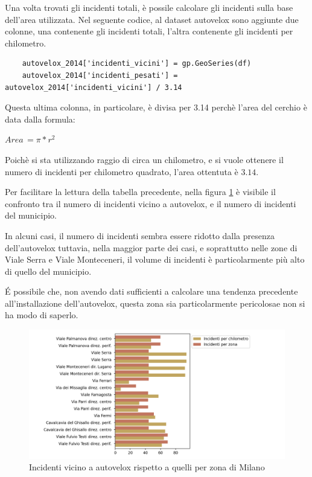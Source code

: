 \documentclass[a4paper]{report}
\begin{document}
Una volta trovati gli incidenti totali, è possile calcolare gli incidenti sulla base dell'area 
utilizzata.
Nel seguente codice, al dataset autovelox sono aggiunte due colonne, una contenente gli 
incidenti totali, l'altra contenente gli incidenti per chilometro.

\begin{lstlisting}
    autovelox_2014['incidenti_vicini'] = gp.GeoSeries(df)
    autovelox_2014['incidenti_pesati'] = autovelox_2014['incidenti_vicini'] / 3.14
\end{lstlisting}

Questa ultima colonna, in particolare, è divisa per 3.14 perchè l'area del cerchio è data dalla formula: 

\begin{center}
    $Area\, = \pi * r^2$
\end{center}

Poichè si sta utilizzando raggio di circa un chilometro, e si vuole ottenere il numero di incidenti per chilometro 
quadrato, l'area ottentuta è $3.14$.

Per facilitare la lettura della tabella precedente, nella figura \ref{fig:confronto-autovelox} è visibile il 
confronto tra il numero di incidenti vicino a autovelox, e il numero di incidenti del municipio.

In alcuni casi, il numero di incidenti sembra essere  ridotto dalla presenza dell'autovelox 
tuttavia, nella maggior parte dei casi, e soprattutto nelle zone di Viale Serra e Viale Monteceneri, 
il volume di incidenti è particolarmente più alto di quello del municipio.

\'E possibile che, non avendo dati sufficienti a calcolare una tendenza precedente all'installazione 
dell'autovelox, questa zona sia particolarmente pericolosae non si ha modo di saperlo.

\begin{figure}
    \includegraphics[width=\linewidth]{../src/municipi_milano/conclusioni_municipio.png}
    \caption{Incidenti vicino a autovelox rispetto a quelli per zona di Milano}
    \label{fig:confronto-autovelox}
\end{figure}
\end{document}
